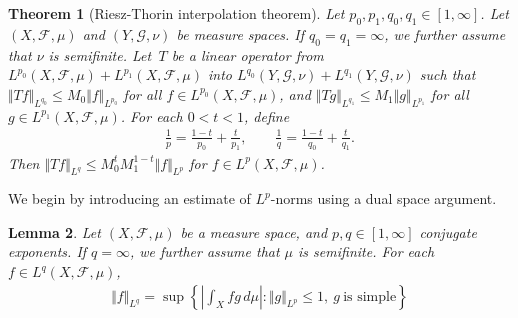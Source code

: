 \documentclass{article}
\numberwithin{equation}{section}
\newcommand{\scr}{\mathscr}
\theoremstyle{plain}
\newtheorem{theorem}{Theorem}[section]
\newtheorem{lemma}[theorem]{Lemma}
\theoremstyle{definition}
\begin{document}
\begin{theorem}[Riesz-Thorin interpolation theorem]\label{rieszthorin}
	Let $p_0,p_1,q_0,q_1\in[1,\infty]$. Let $(X,\scr{F},\mu)$ and $(Y,\scr{G},\nu)$ be measure spaces. If $q_0=q_1=\infty$, we further assume that $\nu$ is semifinite. Let $\,T$ be a linear operator from $L^{p_0}(X,\scr{F},\mu)+L^{p_1}(X,\scr{F},\mu)$ into $L^{q_0}(Y,\scr{G},\nu)+L^{q_1}(Y,\scr{G},\nu)$ such that $\Vert Tf\Vert_{L^{q_0}}\leq M_0\Vert f\Vert_{L^{p_0}}$  for all $f\in L^{p_0}(X,\scr{F},\mu)$, and $\Vert Tg\Vert_{L^{q_1}}\leq M_1\Vert g\Vert_{L^{p_1}}$ for all $g\in L^{p_1}(X,\scr{F},\mu)$. For each $0<t<1$, define
	\begin{align*}
		\frac{1}{p}=\frac{1-t}{p_0}+\frac{t}{p_1},\qquad \frac{1}{q}=\frac{1-t}{q_0}+\frac{t}{q_1}.
	\end{align*}
	Then $\Vert Tf\Vert_{L^q}\leq M_0^tM_1^{1-t}\Vert f\Vert_{L^p}$ for $f\in L^p(X,\scr{F},\mu)$.
\end{theorem}
We begin by introducing an estimate of $L^p$-norms using a dual space argument.
\begin{lemma}\label{rieszthorinlemma2}
Let $(X,\scr{F},\mu)$ be a measure space, and $p,q\in[1,\infty]$ conjugate exponents. If $q=\infty$, we further assume that $\mu$ is semifinite. For each $f\in L^q(X,\scr{F},\mu)$,
\begin{align}
	\Vert f\Vert_{L^q}=\sup\left\{\left\vert\int_Xfg\,d\mu\right\vert:\Vert g\Vert_{L^p}\leq 1,\ g\ \text{is simple}\right\}\label{Lqest}
\end{align}
\end{lemma}
\end{document}
